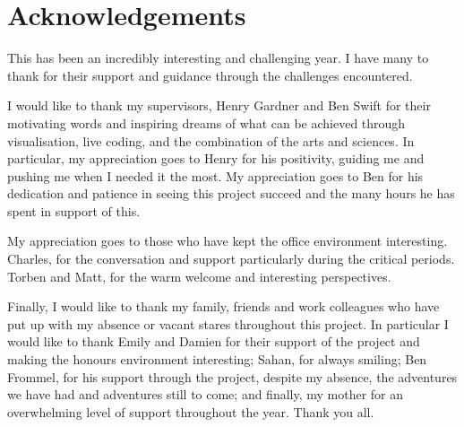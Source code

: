 
\chapter*{Acknowledgements}

This has been an incredibly interesting and challenging year. I have many to thank for their support and guidance through the challenges encountered.

I would like to thank my supervisors, Henry Gardner and Ben Swift for their motivating words and inspiring dreams of what can be achieved through visualisation, live coding, and the combination of the arts and sciences. In particular, my appreciation goes to Henry for his positivity, guiding me and pushing me when I needed it the most. My appreciation goes to Ben for his dedication and patience in seeing this project succeed and the many hours he has spent in support of this.

My appreciation goes to those who have kept the office environment interesting. Charles, for the conversation and support particularly during the critical periods. Torben and Matt, for the warm welcome and interesting perspectives. 

Finally, I would like to thank my family, friends and work colleagues who have put up with my absence or vacant stares throughout this project. In particular I would like to thank Emily and Damien for their support of the project and making the honours environment interesting; Sahan, for always smiling; Ben Frommel, for his support through the project, despite my absence, the adventures we have had and adventures still to come; and finally, my mother for an overwhelming level of support throughout the year. Thank you all.
